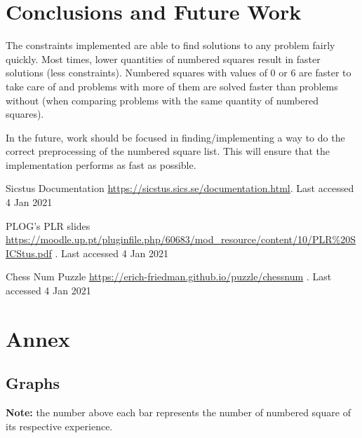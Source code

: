 \documentclass[runningheads]{llncs}
\begin{document}
\section{Conclusions and Future Work}
The constraints implemented are able to find solutions to any problem fairly
quickly. Most times, lower quantities of numbered squares result in faster
solutions (less constraints). Numbered squares with values of 0 or 6 are
faster to take care of and problems with more of them are solved faster than
problems without (when comparing problems with the same quantity of numbered squares).

In the future, work should be focused in finding/implementing a way to do the
correct preprocessing of the numbered square list. This will ensure that the
implementation performs as fast as possible.

\begin{thebibliography}{8}
    Sicstus Documentation
        \href{https://sicstus.sics.se/documentation.html}{https://sicstus.sics.se/documentation.html}.
        Last accessed 4 Jan 2021

    PLOG's PLR slides 
    \href{https://moodle.up.pt/pluginfile.php/60683/mod\_resource/content/10/PLR\%20SICStus.pdf}{https://moodle.up.pt/pluginfile.php/60683/mod\_resource/content/10/PLR\%20SICStus.pdf}
    . Last accessed 4 Jan 2021

    Chess Num Puzzle 
    \href{https://erich-friedman.github.io/puzzle/chessnum}{https://erich-friedman.github.io/puzzle/chessnum}
    . Last accessed 4 Jan 2021
\end{thebibliography}

\section{Annex}
\subsection{Graphs}
\textbf{Note:} the number above each bar represents the number of numbered square of
its respective experience.

\end{document}
